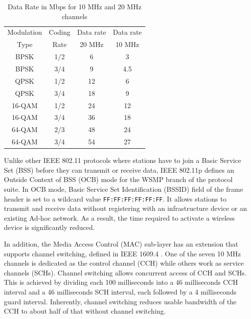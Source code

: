 \documentclass[12pt]{report}
\begin{document}
\begin{table}[htb]
  \begin{center}
    \begin{tabular}{|c|c|c|c|}
      \hline
      Modulation & Coding & Data rate & Data rate     \\
      Type       & Rate   & 20 MHz    & 10 MHz        \\\hline
      BPSK       & 1/2    & 6         & 3             \\\hline
      BPSK       & 3/4    & 9         & 4.5           \\\hline
      QPSK       & 1/2    & 12        & 6             \\\hline
      QPSK       & 3/4    & 18        & 9             \\\hline
      16-QAM     & 1/2    & 24        & 12            \\\hline
      16-QAM     & 3/4    & 36        & 18            \\\hline
      64-QAM     & 2/3    & 48        & 24            \\\hline
      64-QAM     & 3/4    & 54        & 27            \\\hline
    \end{tabular}
    \caption{\label{tab:data_rate}Data Rate in Mbps for 10 MHz and 20 MHz channels}
  \end{center}
\end{table}

Unlike other IEEE 802.11 protocols where stations have to join a Basic Service Set (BSS) before they can transmit or receive data, IEEE 802.11p defines an Outside Context of BSS (OCB) mode for the WSMP branch of the protocol suite. In OCB mode, Basic Service Set Identification (BSSID) field of the frame header is set to a wildcard value \texttt{FF:FF:FF:FF:FF:FF}. It allows stations to transmit and receive data without registering with an infrastructure device or an existing Ad-hoc network. As a result, the time required to activate a wireless device is significantly reduced.

In addition, the Media Access Control (MAC) sub-layer has an extension that supports channel switching, defined in IEEE 1609.4 \cite{ieee16094}. One of the seven 10 MHz channels is dedicated as the control channel (CCH) while others work as service channels (SCHs). Channel switching allows concurrent access of CCH and SCHs. This is achieved by dividing each 100 milliseconds into a 46 milliseconds CCH interval and a 46 milliseconds SCH interval, each followed by a 4 milliseconds guard interval. Inherently, channel switching reduces usable bandwidth of the CCH to about half of that without channel switching.
\end{document}
